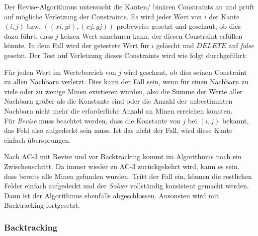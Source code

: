 Der Revise-Algorithmus untersucht die Kanten/ binären Constraints an und prüft auf mögliche Verletzung der Constraints. Es wird jeder Wert
von $i$ der Kante $(i,j)$ bzw. $((xi, yi), (xj, yj))$ probeweise gesetzt und geschaut, ob dies dazu führt, dass $j$ keinen Wert annehmen kann,
der diesen Constraint erfüllen könnte. In dem Fall wird der getestete Wert für $i$ gelöscht und $DELETE$ auf \textit{false} gesetzt. Der Test
auf Verletzung dieses Constraints wird wie folgt durchgeführt:

Für jeden Wert im Wertebereich von $j$ wird geschaut, ob dies seinen Constraint
zu allen Nachbarn verletzt. Dies kann der Fall sein, wenn für einen Nachbarn zu viele oder zu wenige Minen existieren würden, also die Summe
der Werte aller Nachbarn größer als die Konstante sind oder die Anzahl der unbestimmten Nachbarn nicht mehr die erforderliche Anzahl an Minen 
erreichen könnten.\\
Für \textit{Revise} muss beachtet werden, dass die Konstante von $j$ bei $(i,j)$ bekannt, das Feld also aufgedeckt sein muss. Ist
das nicht der Fall, wird diese Kante einfach übersprungen.

Nach AC-3 mit Revise und vor Backtracking kommt im Algorithmus noch ein Zwischenschritt. Da immer wieder zu AC-3 zurückgekehrt wird, kann es 
sein, dass bereits alle Minen gefunden wurden. Tritt der Fall ein, können die restlichen Felder einfach aufgedeckt und der \textit{Solver}
vollständig konsistent gemacht werden. Dann ist der Algorithmus ebenfalls abgeschlossen. Ansonsten wird mit Backtracking fortgesetzt.

\subsubsection{Backtracking}

